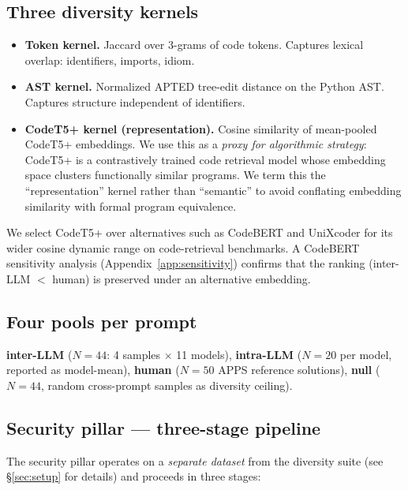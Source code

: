 \documentclass{article}
\begin{document}
\subsection{Three diversity kernels}

\begin{itemize}[leftmargin=*]
  \item \textbf{Token kernel.} Jaccard over 3-grams of code tokens. Captures
    lexical overlap: identifiers, imports, idiom.
  \item \textbf{AST kernel.} Normalized APTED tree-edit distance
    \citep{pawlik2016apted} on the Python AST. Captures structure independent
    of identifiers.
  \item \textbf{CodeT5+ kernel (representation).} Cosine similarity of
    mean-pooled CodeT5+ \citep{wang2023codet5p} embeddings. We use this as
    a \emph{proxy for algorithmic strategy}: CodeT5+ is a contrastively
    trained code retrieval model whose embedding space clusters
    functionally similar programs. We term this the ``representation''
    kernel rather than ``semantic'' to avoid conflating embedding similarity
    with formal program equivalence.
\end{itemize}

We select CodeT5+ over alternatives such as CodeBERT
\citep{feng2020codebert} and UniXcoder \citep{guo2022unixcoder} for its
wider cosine dynamic range on code-retrieval benchmarks. A CodeBERT
sensitivity analysis (Appendix~\ref{app:sensitivity}) confirms that the
ranking (inter-LLM $<$ human) is preserved under an alternative embedding.

\subsection{Four pools per prompt}

\textbf{inter-LLM} ($N{=}44$: 4 samples $\times$ 11 models),
\textbf{intra-LLM} ($N{=}20$ per model, reported as model-mean),
\textbf{human} ($N{=}50$ APPS reference solutions),
\textbf{null} ($N{=}44$, random cross-prompt samples as diversity ceiling).

\subsection{Security pillar --- three-stage pipeline}
\label{sec:sec-method}

The security pillar operates on a \emph{separate dataset} from the diversity
suite (see \S\ref{sec:setup} for details) and proceeds in three stages:
\end{document}
